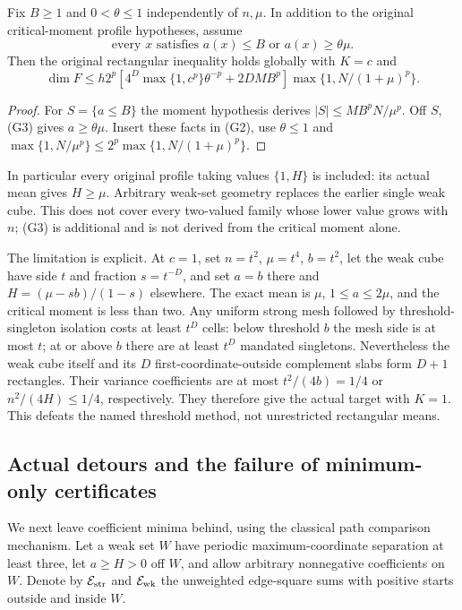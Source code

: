 \begin{theorem}\label{thm:geo-gap}
Fix $B\geq1$ and $0<\theta\leq1$ independently of $n,\mu$. In addition
to the original critical-moment profile hypotheses, assume
\[
 \text{every }x\text{ satisfies }a(x)\leq B\text{ or }a(x)\geq\theta\mu.
                                                                    \tag{G3}
\]
Then the original rectangular inequality holds globally with $K=c$ and
\[
 \dim F\leq h2^p\left[4^D\max\{1,c^p\}\theta^{-p}+2DMB^p\right]
             \max\{1,N/(1+\mu)^p\}.
\]
\end{theorem}
\begin{proof}
For $S=\{a\leq B\}$ the moment hypothesis derives
$|S|\leq MB^pN/\mu^p$. Off $S$, (G3) gives $a\geq\theta\mu$.
Insert these facts in (G2), use $\theta\leq1$ and
$\max\{1,N/\mu^p\}\leq2^p\max\{1,N/(1+\mu)^p\}$.
\end{proof}
In particular every original profile taking values $\{1,H\}$ is included:
its actual mean gives $H\geq\mu$. Arbitrary weak-set geometry replaces the
earlier single weak cube. This does not cover every two-valued family
whose lower value grows with $n$; (G3) is additional and is not derived
from the critical moment alone.

The limitation is explicit. At $c=1$, set $n=t^2$, $\mu=t^4$, $b=t^2$,
let the weak cube have side $t$ and fraction $s=t^{-D}$, and set
$a=b$ there and $H=(\mu-sb)/(1-s)$ elsewhere. The exact mean is $\mu$,
$1\leq a\leq2\mu$, and the critical moment is less than two.
Any uniform strong mesh followed by threshold-singleton isolation costs
at least $t^D$ cells: below threshold $b$ the mesh side is at most $t$;
at or above $b$ there are at least $t^D$ mandated singletons.
Nevertheless the weak cube itself and its $D$ first-coordinate-outside
complement slabs form $D+1$ rectangles. Their variance coefficients are
at most $t^2/(4b)=1/4$ or $n^2/(4H)\leq1/4$, respectively.
They therefore give the actual target with $K=1$. This defeats the named
threshold method, not unrestricted rectangular means.

\subsection{Actual detours and the failure of minimum-only certificates}
We next leave coefficient minima behind, using the classical path
comparison mechanism\cite{geo:comparison}. Let a weak set $W$ have periodic
maximum-coordinate separation at least three, let $a\geq H>0$ off $W$,
and allow arbitrary nonnegative coefficients on $W$. Denote by
$\mathcal E_{\rm str}$ and $\mathcal E_{\rm wk}$ the unweighted edge-square sums with
positive starts outside and inside $W$.

